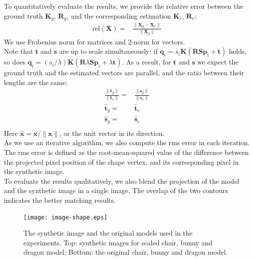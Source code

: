 \documentclass[10pt,twocolumn,letterpaper]{article}
\begin{document}
\noindent
To quantitatively evaluate the results, we provide the relative error between the ground truth $\mathbf{K}_g$, $\mathbf{R}_g$, and the corresponding estimation $\mathbf{K}_e$, $\mathbf{R}_e$:
\begin{equation}
\begin{split}
\textrm{rel}(\mathbf{X})=&\frac{\|\mathbf{X}_g-\mathbf{X}_e\|}{\|\mathbf{X}_g\|}
\end{split}
\end{equation}
We use Frobenius norm for matrices and 2-norm for vectors.\\

\noindent
Note that $\mathbf{t}$ and $\mathbf{s}$ are up to scale simultaneously: if $\mathbf{q}_i=s_i\mathbf{K}(\mathbf{R}\mathbf{S}\mathbf{p}_i + \mathbf{t})$ holds, so does $\mathbf{q}_i=(s_i/\lambda)\mathbf{K}(\mathbf{R}\lambda\mathbf{S}\mathbf{p}_i + \lambda\mathbf{t})$. As a result, for $\mathbf{t}$ and $\mathbf{s}$ we expect the ground truth and the estimated vectors are parallel, and the ratio between their lengths are the same:
\begin{equation}
\begin{split}
\frac{\|\mathbf{t}_g\|}{\|\mathbf{t}_e\|}=&\frac{\|\mathbf{s}_g\|}{\|\mathbf{s}_e\|}\\
\hat{\mathbf{t}}_g=&\hat{\mathbf{t}}_e\\
\hat{\mathbf{s}}_g=&\hat{\mathbf{s}}_e\\
\end{split}
\end{equation}
Here $\hat{\mathbf{x}}=\mathbf{x}/\|\mathbf{x}\|$, or the unit vector in its direction.\\

\noindent
As we use an iterative algorithm, we also compute the rms error in each iteration. The rms error is defined as the root-mean-squared value of the difference between the projected pixel position of the shape vertex, and its corresponding pixel in the synthetic image.\\

\noindent
To evaluate the results qualitatively, we also blend the projection of the model and the synthetic image in a single image. The overlap of the two contours indicates the better matching results.\\

\begin{figure}
\begin{center}
	\texttt{[image: image-shape.eps]}
\end{center}
   \caption{The synthetic image and the original models used in the experiments. Top: synthetic images for scaled chair, bunny and dragon model; Bottom: the original chair, bunny and dragon model.}
\label{fig:imageshape}
\end{figure}
\end{document}
